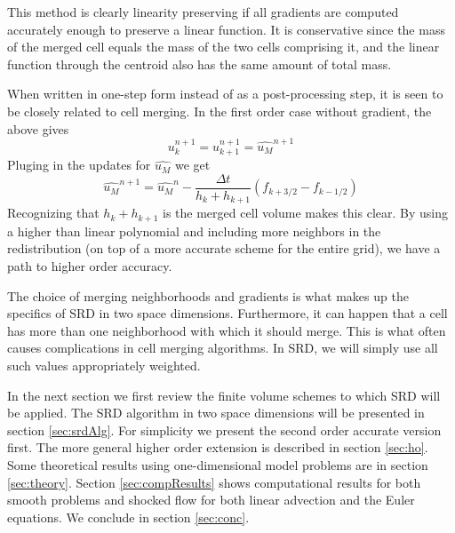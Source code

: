 This method is clearly linearity preserving if all gradients are
computed accurately enough to preserve a linear function.  
It is conservative since the mass of the merged cell equals the mass of
the two cells comprising it, and the linear function through the
centroid also has the same amount of total mass.

When written in one-step form instead of as a post-processing step, 
it is seen to be closely related to cell merging. 
In the first order case without gradient, the above gives
\begin{equation}
u_k^{n+1} = u_{k+1}^{n+1} = \widehat{u_M}^{n+1} 
\end{equation}
Pluging in the updates for $\widehat{u_M}$ we get
\begin{equation}
\widehat{u_M}^{n+1} = \widehat{u_M}^n - 
\frac{\Delta t}{h_k + h_{k+1}} (f_{k+3/2} - f_{k-1/2})
\end{equation}
Recognizing that $h_k+h_{k+1}$ is the merged cell volume makes this
clear.
By using a higher than linear polynomial and
including more neighbors in the
redistribution (on top of a more accurate scheme for the entire grid),
we have a path to higher order accuracy.

The choice of merging neighborhoods and gradients is what makes up the
specifics of SRD in two space dimensions. Furthermore, it can happen
that a cell has more than one neighborhood with
which it should merge. This is what often causes complications in cell
merging algorithms. In SRD, we will simply use all such values appropriately
weighted.

In the next section  we first review the finite volume schemes to which SRD will
be applied.
The SRD algorithm in two space dimensions will be presented in section
\ref{sec:srdAlg}.
For simplicity we present the second order accurate version first.
The more general higher order extension is described in 
section \ref{sec:ho}.
Some theoretical results using one-dimensional model problems are in
section \ref{sec:theory}. 
Section \ref{sec:compResults} shows computational results for both smooth
problems and shocked flow for both linear advection and the Euler equations.  We conclude in section \ref{sec:conc}.
